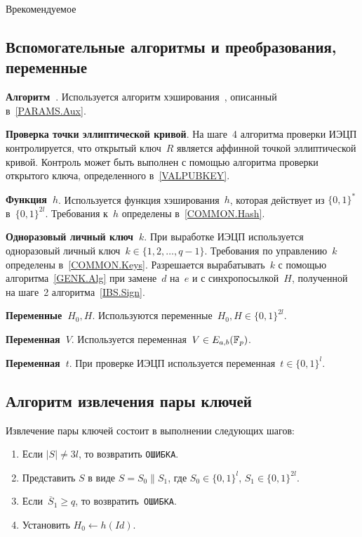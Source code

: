 \begin{appendix}{В}{рекомендуемое}
\subsection{Вспомогательные алгоритмы и преобразования, 
переменные}\label{IBS.Transforms}

{\bf Алгоритм~}.
Используется алгоритм хэширования~, 
описанный в~\ref{PARAMS.Aux}.

{\bf Проверка точки эллиптической кривой}.
На шаге~4 алгоритма проверки ИЭЦП контролируется,
что открытый ключ~$R$ является аффинной точкой эллиптической кривой.
Контроль может быть выполнен с помощью алгоритма
проверки открытого ключа, определенного в~\ref{VALPUBKEY}.

{\bf Функция~$h$}.
Используется функция хэширования~$h$, 
которая действует из $\{0,1\}^{*}$ в~$\{0,1\}^{2l}$.
Требования к~$h$ определены в~\ref{COMMON.Hash}.

{\bf Одноразовый личный ключ~$k$}.
При выработке ИЭЦП используется одноразовый личный 
ключ~$k\in\{1,2,\ldots,q-1\}$.
Требования по управлению~$k$ определены в~\ref{COMMON.Keys}.
Разрешается вырабатывать~$k$ с помощью алгоритма~\ref{GENK.Alg}
при замене~$d$ на~$e$ и с синхропосылкой~$H$, 
полученной на шаге~2 алгоритма~\ref{IBS.Sign}.

{\bf Переменные~$H_0, H$}.
Используются переменные~$H_0, H\in\{0,1\}^{2l}$.

{\bf Переменная~$V$}.
Используется переменная~$V\in E_{a,b}(\mathbb{F}_p)$.

{\bf Переменная~$t$}.
При проверке ИЭЦП используется переменная~$t\in\{0,1\}^{l}$.

\subsection{Алгоритм извлечения пары ключей}
\label{IBS.Extract}

Извлечение пары ключей состоит в выполнении следующих шагов:
\begin{enumerate}
\item
Если $|S|\neq 3l$,
то возвратить \texttt{ОШИБКА}.

\item
Представить $S$ в виде $S=S_0\parallel S_1$,
где $S_0\in\{0,1\}^{l}$, $S_1\in\{0,1\}^{2l}$.

\item
Если~$\overline{S}_1\geq q$,
то возвратить~\texttt{ОШИБКА}.

\item
Установить $H_0\leftarrow h(Id)$.


\end{enumerate}
\end{appendix}
